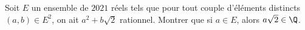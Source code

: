 Soit $E$ un ensemble de $2021$ réels tels que pour tout couple d'éléments distincts $(a, b) \in E^2$, on ait $a^2+b\sqrt2$ rationnel. Montrer que si $a\in E$, alors $a\sqrt2\in \Q$.